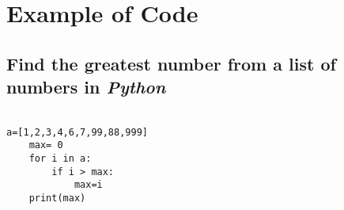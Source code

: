 \chapter{Example of Code}

\section{Find the greatest number from a list of numbers in \textit{Python}}

\begin{verbatim}

a=[1,2,3,4,6,7,99,88,999]
    max= 0
    for i in a:
        if i > max:
            max=i
    print(max)

\end{verbatim}